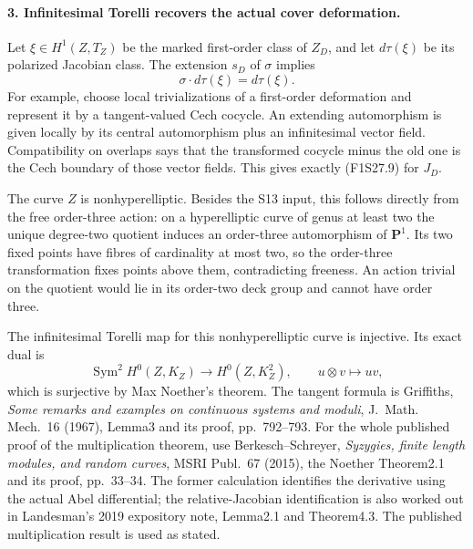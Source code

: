 \paragraph{3. Infinitesimal Torelli recovers the actual cover deformation.}
Let $\xi\in H^1(Z,T_Z)$ be the marked first-order
class of $Z_D$, and let $d\tau(\xi)$ be its polarized
Jacobian class. The extension $s_D$ of $\sigma$ implies
\[
                   \sigma\cdot d\tau(\xi)=d\tau(\xi).
 \tag{F1S27.9}
\]
For example, choose local trivializations of a first-order
deformation and represent it by a tangent-valued Cech
cocycle. An extending automorphism is given locally by
its central automorphism plus an infinitesimal vector field.
Compatibility on overlaps says that the transformed cocycle
minus the old one is the Cech boundary of those vector
fields. This gives exactly (F1S27.9) for $J_D$.

The curve $Z$ is nonhyperelliptic. Besides the S13 input,
this follows directly from the free order-three action:
on a hyperelliptic curve of genus at least two the unique
degree-two quotient induces an order-three automorphism
of $\mathbf P^1$. Its two fixed points have fibres of
cardinality at most two, so the order-three transformation
fixes points above them, contradicting freeness.
An action trivial on the quotient would lie in its
order-two deck group and cannot have order three.

The infinitesimal Torelli map for this nonhyperelliptic
curve is injective. Its exact dual is
\[
 \operatorname{Sym}^2H^0(Z,K_Z)\longrightarrow H^0(Z,K_Z^2),
                         \qquad u\otimes v\longmapsto uv,
 \tag{F1S27.10}
\]
which is surjective by Max Noether's theorem.
The tangent formula is Griffiths, \emph{Some remarks and
examples on continuous systems and moduli}, J.~Math.
Mech.~16 (1967), Lemma3 and its proof, pp.~792--793.
For the whole published proof of the multiplication
theorem, use Berkesch--Schreyer, \emph{Syzygies, finite
length modules, and random curves}, MSRI Publ.~67 (2015),
the Noether Theorem2.1 and its proof, pp.~33--34.
The former calculation identifies the derivative using
the actual Abel differential; the relative-Jacobian
identification is also worked out in Landesman's
2019 expository note, Lemma2.1 and Theorem4.3.
The published multiplication result is used as stated.

